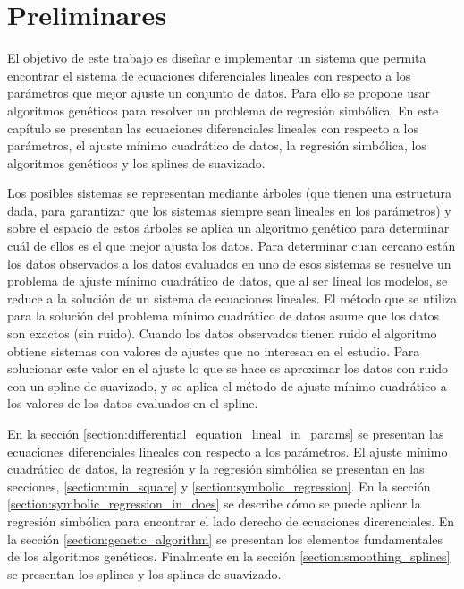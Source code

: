 \chapter{Preliminares}\label{chapter:preliminaries}

El objetivo de este trabajo es diseñar e implementar un sistema que permita encontrar el sistema de ecuaciones diferenciales lineales con respecto a los parámetros que mejor ajuste un conjunto de datos. Para ello se propone usar algoritmos genéticos para resolver un problema de regresión simbólica. En este capítulo se presentan las ecuaciones diferenciales lineales con respecto a los parámetros, el ajuste mínimo cuadrático de datos, la regresión simbólica, los algoritmos genéticos y los splines de suavizado.

Los posibles sistemas se representan mediante árboles (que tienen una estructura dada, para garantizar que los sistemas siempre sean lineales en los parámetros) y sobre el espacio de estos árboles se aplica un algoritmo genético para determinar cuál de ellos es el que mejor ajusta los datos. Para determinar cuan cercano están los datos observados a los datos evaluados en uno de esos sistemas se resuelve un problema de ajuste mínimo cuadrático de datos, que al ser lineal los modelos, se reduce a la solución de un sistema de ecuaciones lineales. El método que se utiliza para la solución del problema mínimo cuadrático de datos asume que los datos son exactos (sin ruido). Cuando los datos observados tienen ruido el algoritmo obtiene sistemas con valores de ajustes que no interesan en el estudio. Para solucionar este valor en el ajuste lo que se hace es aproximar los datos con ruido con un spline de suavizado, y se aplica el método de ajuste mínimo cuadrático a los valores de los datos evaluados en el spline.

En la sección \ref{section:differential_equation_lineal_in_params} se presentan las ecuaciones diferenciales lineales con respecto a los parámetros. El ajuste mínimo cuadrático de datos, la regresión y la regresión simbólica se presentan en las secciones, \ref{section:min_square} y \ref{section:symbolic_regression}. En la sección \ref{section:symbolic_regression_in_does} se describe cómo se puede aplicar la regresión simbólica para encontrar el lado derecho de ecuaciones direrenciales. En la sección \ref{section:genetic_algorithm} se presentan los elementos fundamentales de los algoritmos genéticos. Finalmente en la sección \ref{section:smoothing_splines} se presentan los splines y los splines de suavizado.

